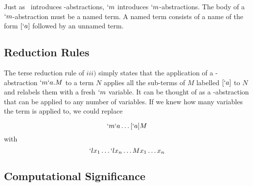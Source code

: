   Just as \lam\ introduces \lam-abstractions, 
  $`m$ introduces $`m$-abstractions. 
  The body of a $`m$-abstraction must be a named term. 
  A named term consists of a name of the form $[`a]$ followed by an unnamed 
  term. 

  \begin{figure}[!h]
  \end{figure}
  
  \subsection{Reduction Rules}
  \begin{figure}[!h]
  \end{figure}

  The terse reduction rule of $iii)$ simply states that the application of a \lmu-abstraction $`m`a.M$ to a term $N$ applies all the sub-terms of $M$ labelled $[`a]$ to $N$ and relabels them with a fresh $`m$ variable.
  It can be thought of as a \lam-abstraction that can be applied to any number of variables.
  If we knew how many variables the term is applied to, we could replace
  
  \[ `m`a\dots[`a]M \]
  with 
  \[ `lx_1\dots`lx_n\dots Mx_1\dots x_n \]
  \cite{Parigot92}
  
  \subsection{Computational Significance}

